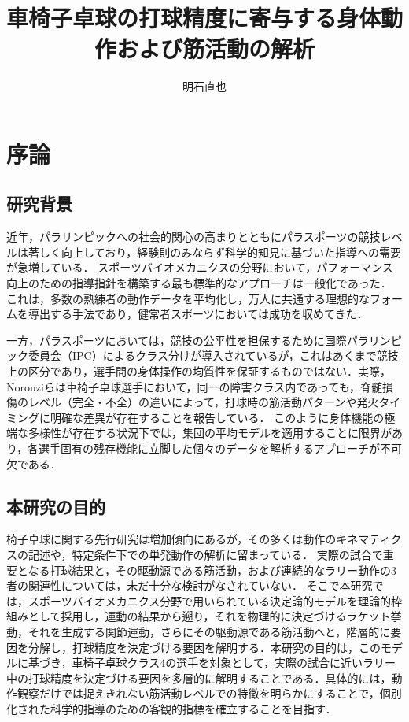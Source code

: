 \documentclass{/workdir/classes/summary}
\title{車椅子卓球の打球精度に寄与する身体動作および筋活動の解析}
\author{明石直也}
\begin{document}
\maketitle

\section{序論}

\subsection{研究背景}
近年，パラリンピックへの社会的関心の高まりとともにパラスポーツの競技レベルは著しく向上しており，経験則のみならず科学的知見に基づいた指導への需要が急増している．
スポーツバイオメカニクスの分野において，パフォーマンス向上のための指導指針を構築する最も標準的なアプローチは一般化であった．
これは，多数の熟練者の動作データを平均化し，万人に共通する理想的なフォームを導出する手法であり，健常者スポーツにおいては成功を収めてきた\cite{leesTechniqueAnalysisSports2002}．

一方，パラスポーツにおいては，競技の公平性を担保するために国際パラリンピック委員会（IPC）によるクラス分けが導入されているが\cite{tweedyInternationalParalympicCommittee2011}，これはあくまで競技上の区分であり，選手間の身体操作の均質性を保証するものではない．実際，Norouziらは車椅子卓球選手において，同一の障害クラス内であっても，脊髄損傷のレベル（完全・不全）の違いによって，打球時の筋活動パターンや発火タイミングに明確な差異が存在することを報告している\cite{norouziElectromyographicAnalysisElite2025}．
このように身体機能の極端な多様性が存在する状況下では，集団の平均モデルを適用することに限界があり，各選手固有の残存機能に立脚した個々のデータを解析するアプローチが不可欠である．

\subsection{本研究の目的}
椅子卓球に関する先行研究は増加傾向にあるが，その多くは動作のキネマティクスの記述や，特定条件下での単発動作の解析に留まっている\cite{yamMeasuringUpperLimb2021}\cite{zemkovaAssociationTrunkRotational2018}．
実際の試合で重要となる打球結果と，その駆動源である筋活動，および連続的なラリー動作の3者の関連性については，未だ十分な検討がなされていない\cite{ikenagaInfluenceBallImpact2020}．
そこで本研究では，スポーツバイオメカニクス分野で用いられている決定論的モデル\cite{chowUseDeterministicModels2011}を理論的枠組みとして採用し，運動の結果から遡り，それを物理的に決定づけるラケット挙動，それを生成する関節運動，さらにその駆動源である筋活動へと，階層的に要因を分解し，打球精度を決定づける要因を解明する．本研究の目的は，このモデルに基づき，車椅子卓球クラス4の選手を対象として，実際の試合に近いラリー中の打球精度を決定づける要因を多層的に解明することである．具体的には，動作観察だけでは捉えきれない筋活動レベルでの特徴を明らかにすることで，個別化された科学的指導のための客観的指標を確立することを目指す．
\end{document}
